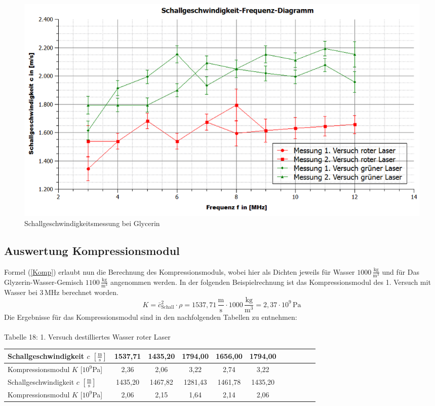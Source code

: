 \documentclass[fontsize=12pt]{scrartcl}
\begin{document}
\noindent
\begin{figure}[h]
\includegraphics[scale=0.5]{Graphik/SchallgeschwindigkeitGlycerinFehlerbalken}
\caption{Schallgeschwindigkeitsmessung bei Glycerin}
\end{figure}
\newpage
\noindent

\subsection{Auswertung Kompressionsmodul}

Formel (\ref{Komp}) erlaubt nun die Berechnung des Kompressionsmoduls, wobei hier als Dichten jeweils für Wasser $1000\,\frac{{\text{kg}}}{{\text{m}^3}}$ und für Das Glyzerin-Wasser-Gemisch  $1100\,\frac{{\text{kg}}}{{\text{m}^3}}$ angenommen werden.
In der folgenden Beispielrechnung ist das Kompressionsmodul des 1. Versuch mit Wasser bei $3\,{\text{MHz}}$ berechnet worden.
\begin{equation*}
K = \bar{c}^2_{\text{Schall}} \cdot \rho  = 1537,71\,\frac{{\text{m}}}{{\text{s}}} \cdot 1000\,\frac{{\text{kg}}}{{\text{m}^3}}=2,37 \cdot 
10^9\,{\text{Pa}}
\end{equation*}
\noindent
Die Ergebnisse für das Kompressionsmodul sind in den nachfolgenden Tabellen zu entnehmen:\\
~\\
Tabelle 18: 1. Versuch destilliertes Wasser roter Laser  \\
\begin{tabular}{|l|c|c|c|c|c|c|c|c|c|c|} \hline
Schallgeschwindigkeit $c$ $[\frac{{\text{m}}}{{\text{s}}}]$ & 1537,71 &1435,20 &1794,00 &1656,00 & 1794,00 \\ \hline
Kompressionsmodul $K$ [$10^{9}$Pa] & 2,36 & 2,06 & 3,22 & 2,74 & 3,22  \\ \hline
Schallgeschwindigkeit $c$ $[\frac{{\text{m}}}{{\text{s}}}]$ & 1435,20 & 1467,82 &1281,43 &1461,78 &1435,20 \\ \hline
Kompressionsmodul $K$ [$10^9$Pa] & 2,06 & 2,15 & 1,64 & 2,14 & 2,06  \\ \hline
\end{tabular} \\
\end{document}
